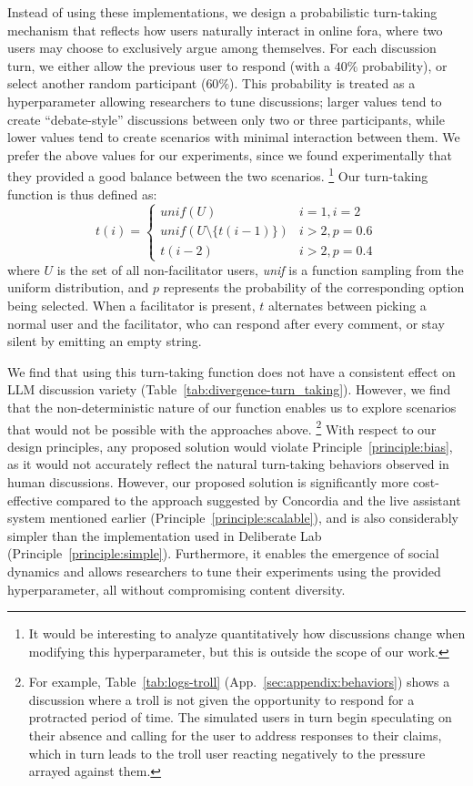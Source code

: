 Instead of using these implementations, we design a probabilistic turn-taking mechanism that reflects how users naturally interact in online fora, where two users may choose to exclusively argue among themselves. For each discussion turn, we either allow the previous user to respond (with a $40\%$ probability), or select another random participant ($60\%$). This probability is treated as a hyperparameter allowing researchers to tune discussions; larger values tend to create ``debate-style'' discussions between only two or three participants, while lower values tend to create scenarios with minimal interaction between them. We prefer the above values for our experiments, since we found experimentally that they provided a good balance between the two scenarios. \footnote{It would be interesting to analyze quantitatively how discussions change when modifying this hyperparameter, but this is outside the scope of our work.} Our turn-taking function is thus defined as:
\[
t(i) = \left\{
\begin{array}{ll}
	\textit{unif}(U) & i=1, i=2 \\
	\textit{unif}(U \setminus \{t(i-1)\}) & i > 2, p=0.6 \\
	t(i-2) & i > 2, p=0.4 
\end{array} 
\right.
\]
\noindent where $U$ is the set of all non-facilitator users, \textit{unif} is a function sampling from the uniform distribution, and $p$ represents the probability of the corresponding option being selected. When a facilitator is present, $t$ alternates between picking a normal user and the facilitator, who can respond after every comment, or stay silent by emitting an empty string. 

We find that using this turn-taking function does not have a consistent effect on LLM discussion variety  (Table~\ref{tab:divergence-turn_taking}). However, we find that the non-deterministic nature of our function enables us to explore scenarios that would not be possible with the approaches above. \footnote{For example, Table~\ref{tab:logs-troll} (App.~\ref{sec:appendix:behaviors}) shows a discussion where a troll is not given the opportunity to respond for a protracted period of time. The simulated users in turn begin speculating on their absence and calling for the user to address responses to their claims, which in turn leads to the troll user reacting negatively to the pressure arrayed against them.} With respect to our design principles, any proposed solution would violate Principle~\ref{principle:bias}, as it would not accurately reflect the natural turn-taking behaviors observed in human discussions. However, our proposed solution is significantly more cost-effective compared to the approach suggested by Concordia and the live assistant system mentioned earlier (Principle~\ref{principle:scalable}), and is also considerably simpler than the implementation used in Deliberate Lab (Principle~\ref{principle:simple}). Furthermore, it enables the emergence of social dynamics and allows researchers to tune their experiments using the provided hyperparameter, all without compromising content diversity.

